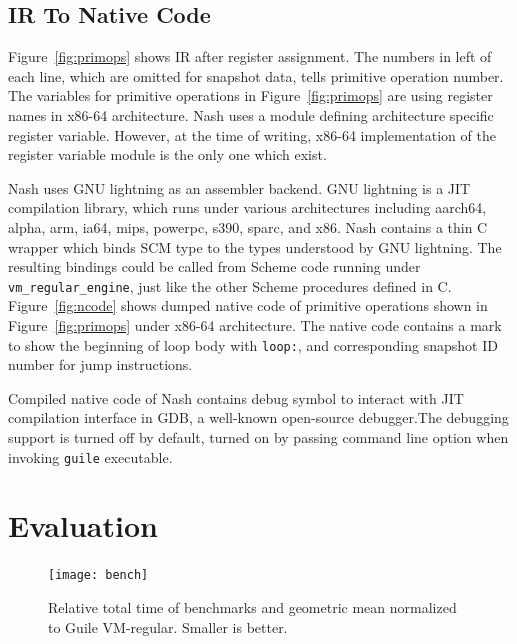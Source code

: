 \documentclass[preprint]{sigplanconf}
\begin{document}
\subsection{IR To Native Code}
Figure~\hyperref[fig:primops]{\ref{fig:primops}} shows IR after register
assignment. The numbers in left of each line, which are omitted for snapshot
data, tells primitive operation number. The variables for primitive operations
in Figure~\hyperref[fig:primops]{\ref{fig:primops}} are using register names
in x86-64 architecture. Nash uses a module defining architecture specific
register variable. However, at the time of writing, x86-64 implementation of
the register variable module is the only one which exist.

Nash uses GNU lightning as an assembler backend.  GNU lightning is a JIT
compilation library, which runs under various architectures including aarch64,
alpha, arm, ia64, mips, powerpc, s390, sparc, and x86. Nash contains a thin C
wrapper which binds SCM type to the types understood by GNU lightning. The
resulting bindings could be called from Scheme code running under
\texttt{vm\_regular\_engine}, just like the other Scheme procedures defined in
C. Figure~\hyperref[fig:ncode]{\ref{fig:ncode}} shows dumped native code of
primitive operations shown in Figure~\hyperref[fig:primops]{\ref{fig:primops}}
under x86-64 architecture. The native code contains a mark to show the
beginning of loop body with \texttt{loop:}, and corresponding snapshot ID
number for jump instructions.

Compiled native code of Nash contains debug symbol to interact with JIT
compilation interface in GDB, a well-known open-source debugger.\@ The
debugging support is turned off by default, turned on by passing command line
option when invoking \texttt{guile} executable.

\section{Evaluation}
\label{sec:evaluation}

\begin{figure}
  \centering
  \texttt{[image: bench]}
  \caption{Relative total time of benchmarks and geometric mean normalized to
    Guile VM-regular. Smaller is better.}
\label{fig:bench}
\end{figure}
\end{document}

